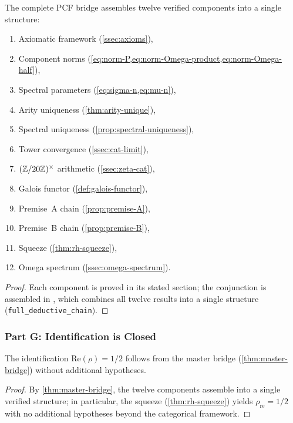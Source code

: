 \begin{theorem}%
  \label{thm:master-bridge}
The complete PCF bridge assembles twelve verified components into a
single structure:
\begin{enumerate}
  \item Axiomatic framework (\cref{ssec:axioms}),
  \item Component norms (\cref{eq:norm-P,eq:norm-Omega-product,eq:norm-Omega-half}),
  \item Spectral parameters (\cref{eq:sigma-n,eq:mu-n}),
  \item Arity uniqueness (\cref{thm:arity-unique}),
  \item Spectral uniqueness (\cref{prop:spectral-uniqueness}),
  \item Tower convergence (\cref{ssec:cat-limit}),
  \item $(\mathbb{Z}/20\mathbb{Z})^\times$ arithmetic (\cref{ssec:zeta-cat}),
  \item Galois functor (\cref{def:galois-functor}),
  \item Premise~A chain (\cref{prop:premise-A}),
  \item Premise~B chain (\cref{prop:premise-B}),
  \item Squeeze (\cref{thm:rh-squeeze}),
  \item Omega spectrum (\cref{ssec:omega-spectrum}).
\end{enumerate}
\end{theorem}

\begin{proof}
Each component is proved in its stated section; the conjunction is
assembled in , 
which combines all twelve results into a single structure 
(\texttt{full\_deductive\_chain}).

\end{proof}


\subsubsection{Part G: Identification is Closed}

\begin{corollary}%
  \label{cor:identification}
The identification $\mathrm{Re}(\rho)=1/2$ follows from the master
bridge (\cref{thm:master-bridge}) without additional hypotheses.
\end{corollary}

\begin{proof}
By \cref{thm:master-bridge}, the twelve components assemble into
a single verified structure; in particular, the squeeze
(\cref{thm:rh-squeeze}) yields $\rho_{\mathrm{re}}=1/2$ with no
additional hypotheses beyond the categorical framework.
\end{proof}


